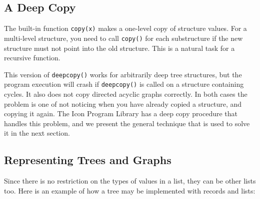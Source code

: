 \subsection*{A Deep Copy}

The built-in function \texttt{copy(x)} makes a one-level
copy of structure values. For a multi-level structure, you need to call
\texttt{copy()} for each substructure if the new structure must not
point into the old structure. This is a natural task for
a recursive function.


This version of \texttt{deepcopy()} works for
arbitrarily deep tree structures, but the program execution
will crash if \texttt{deepcopy()} is called on a structure containing
cycles. It also does not copy directed acyclic graphs correctly. In
both cases the problem is one of not noticing when you have already
copied a structure, and copying it again. The Icon Program Library has
a deep copy procedure that handles this problem, and we present the
general technique that is used to solve it in the next section.

\subsection*{Representing Trees and Graphs}

Since there is no restriction on the types of values in a list, they can
be other lists too. Here is an example of how a tree may be implemented
with records and lists:

